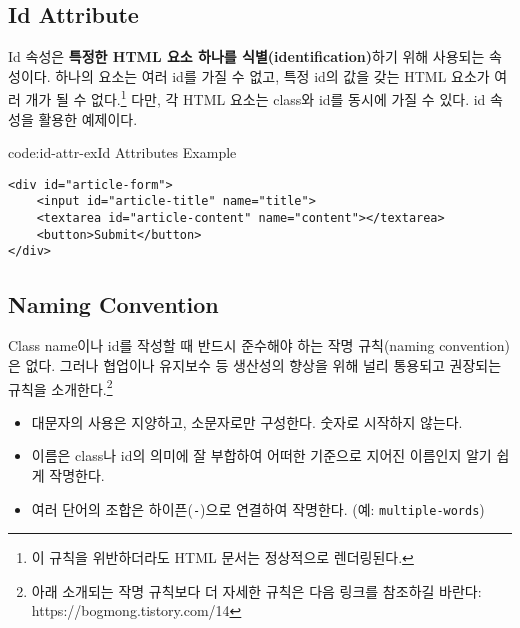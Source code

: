\subsection*{Id Attribute}
Id 속성은 \textbf{특정한 HTML 요소 하나를 식별(identification)}하기 위해 사용되는 속성이다. 하나의 요소는 여러 id를 가질 수 없고, 특정 id의 값을 갖는 HTML 요소가 여러 개가 될 수 없다.\footnote{이 규칙을 위반하더라도 HTML 문서는 정상적으로 렌더링된다.} 다만, 각 HTML 요소는 class와 id를 동시에 가질 수 있다. \은 id 속성을 활용한 예제이다.

\begin{codeenv}{code:id-attr-ex}{Id Attributes Example}\begin{verbatim}
<div id="article-form">
    <input id="article-title" name="title">
    <textarea id="article-content" name="content"></textarea>
    <button>Submit</button>
</div>
\end{verbatim}
\end{codeenv}

\subsection*{Naming Convention}
Class name이나 id를 작성할 때 반드시 준수해야 하는 작명 규칙(naming convention)은 없다. 그러나 협업이나 유지보수 등 생산성의 향상을 위해 널리 통용되고 권장되는 규칙을 소개한다.\footnote{아래 소개되는 작명 규칙보다 더 자세한 규칙은 다음 링크를 참조하길 바란다: https://bogmong.tistory.com/14}

\begin{itemize}
    \item 대문자의 사용은 지양하고, 소문자로만 구성한다. 숫자로 시작하지 않는다.
    \item 이름은 class나 id의 의미에 잘 부합하여 어떠한 기준으로 지어진 이름인지 알기 쉽게 작명한다.
    \item 여러 단어의 조합은 하이픈(\texttt{-})으로 연결하여 작명한다. (예: \texttt{multiple-words})
\end{itemize}
